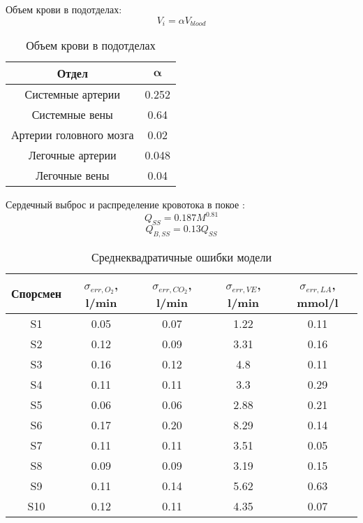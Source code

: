 Объем крови в подотделах:
\begin{equation}
    V_{i}=\alpha V_{blood}
\end{equation}
\begin{table}[!ht]
\centering
\caption{Объем крови в подотделах}
\medskip
\label{tabular:blood_volume}
\begin{tabular}{|c|c|}
\hline
\textbf{Отдел} & $\mathbf{\alpha}$ \\
\hline
Системные артерии & 0.252 \\
\hline
Системные вены & 0.64 \\
\hline
Артерии головного мозга & 0.02 \\
\hline
Легочные артерии & 0.048 \\
\hline
Легочные вены & 0.04 \\
\hline
\end{tabular}
\end{table}
Сердечный выброс и распределение кровотока в покое \cite{duke2015,schmidt}:
\begin{equation}
    Q_{SS}=0.187M^{0.81}
\end{equation}
\begin{equation}
    Q_{B,SS}=0.13Q_{SS}
\end{equation}

\begin{table}[!ht]
\centering
\caption{Среднеквадратичные ошибки модели}
\medskip
\label{tabular:tab2}
\begin{tabular}{|c|c|c|c|c|}
\hline
Спорсмен & \(\sigma_{err,O_{2}}\), l/min  & \(\sigma_{err,CO_{2}}\), l/min & \(\sigma_{err,VE}\),  l/min & \(\sigma_{err,LA}\), mmol/l\\
\hline
S1 & 0.05 & 0.07 & 1.22 & 0.11 \\
\hline
S2 & 0.12 & 0.09 & 3.31 & 0.16 \\
\hline
S3 & 0.16 & 0.12 & 4.8 & 0.11  \\
\hline
S4 & 0.11 & 0.11 & 3.3 & 0.29  \\
\hline
S5 & 0.06 & 0.06 & 2.88 & 0.21  \\
\hline
S6 & 0.17 & 0.20 & 8.29 & 0.14  \\
\hline
S7 & 0.11 & 0.11 & 3.51 & 0.05  \\
\hline
S8 & 0.09 & 0.09 & 3.19 & 0.15  \\
\hline
S9 & 0.11 & 0.14 & 5.62 & 0.63  \\
\hline
S10 & 0.12 & 0.11 & 4.35 & 0.07  \\
\hline
\end{tabular}
\end{table}

